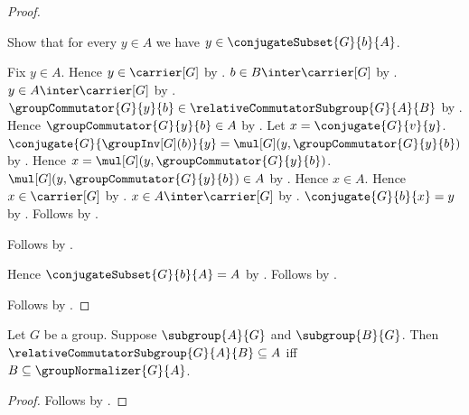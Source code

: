 \begin{proof}
\begin{subproof}
\begin{subproof}
            Show that for every $y\in A$ we have
                $y\in\conjugateSubset{G}{b}{A}$.
            \begin{subproof}
                Fix $y\in A$.
                Hence $y\in\carrier[G]$ by .
                $b\in B\inter\carrier[G]$ by .
                $y\in A\inter\carrier[G]$ by .
                $\groupCommutator{G}{y}{b}\in
                    \relativeCommutatorSubgroup{G}{A}{B}$ by
                    .
                Hence $\groupCommutator{G}{y}{b}\in A$ by
                    .
                Let $x=\conjugate{G}{v}{y}$.
                $\conjugate{G}{\groupInv[G](b)}{y}=
                    \mul[G](y,\groupCommutator{G}{y}{b})$ by
                    .
                Hence $x=\mul[G](y,\groupCommutator{G}{y}{b})$.
                $\mul[G](y,\groupCommutator{G}{y}{b})\in A$ by
                    .
                Hence $x\in A$.
                Hence $x\in\carrier[G]$ by .
                $x\in A\inter\carrier[G]$ by .
                $\conjugate{G}{b}{x}=y$ by
                    .
                Follows by .
            \end{subproof}
            Follows by .
        \end{subproof}
        Hence $\conjugateSubset{G}{b}{A}=A$ by
            .
        Follows by .
    \end{subproof}
    Follows by .
\end{proof}

\begin{corollary}\label{relative_commutator_le_iff_subset_normalizer}
    Let $G$ be a group.
    Suppose $\subgroup{A}{G}$ and $\subgroup{B}{G}$.
    Then
        $\relativeCommutatorSubgroup{G}{A}{B}\subseteq A$ iff
        $B\subseteq\groupNormalizer{G}{A}$.
\end{corollary}
\begin{proof}
    Follows by
        .
\end{proof}


